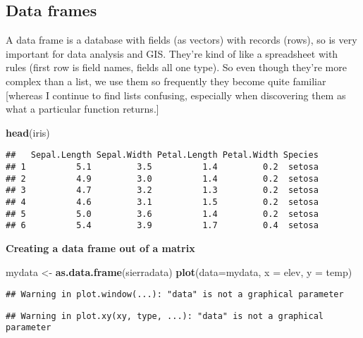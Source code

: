 \documentclass[
]{book}
\newenvironment{Shaded}{\begin{snugshade}}{\end{snugshade}}
\newcommand{\DataTypeTok}[1]{\textcolor[rgb]{0.13,0.29,0.53}{#1}}
\newcommand{\KeywordTok}[1]{\textcolor[rgb]{0.13,0.29,0.53}{\textbf{#1}}}
\newcommand{\NormalTok}[1]{#1}
\newcommand{\StringTok}[1]{\textcolor[rgb]{0.31,0.60,0.02}{#1}}
\begin{document}
\hypertarget{data-frames}{%
\subsection{Data frames}\label{data-frames}}

A data frame is a database with fields (as vectors) with records (rows), so is very important for data analysis and GIS. They're kind of like a spreadsheet with rules (first row is field names, fields all one type). So even though they're more complex than a list, we use them so frequently they become quite familiar {[}whereas I continue to find lists confusing, especially when discovering them as what a particular function returns.{]}

\begin{Shaded}
\begin{Highlighting}[]
\KeywordTok{head}\NormalTok{(iris)}
\end{Highlighting}
\end{Shaded}

\begin{verbatim}
##   Sepal.Length Sepal.Width Petal.Length Petal.Width Species
## 1          5.1         3.5          1.4         0.2  setosa
## 2          4.9         3.0          1.4         0.2  setosa
## 3          4.7         3.2          1.3         0.2  setosa
## 4          4.6         3.1          1.5         0.2  setosa
## 5          5.0         3.6          1.4         0.2  setosa
## 6          5.4         3.9          1.7         0.4  setosa
\end{verbatim}

\textbf{Creating a data frame out of a matrix}

\begin{Shaded}
\begin{Highlighting}[]
\NormalTok{mydata <-}\StringTok{ }\KeywordTok{as.data.frame}\NormalTok{(sierradata)}
\KeywordTok{plot}\NormalTok{(}\DataTypeTok{data=}\NormalTok{mydata, }\DataTypeTok{x =}\NormalTok{ elev, }\DataTypeTok{y =}\NormalTok{ temp)}
\end{Highlighting}
\end{Shaded}

\begin{verbatim}
## Warning in plot.window(...): "data" is not a graphical parameter
\end{verbatim}

\begin{verbatim}
## Warning in plot.xy(xy, type, ...): "data" is not a graphical parameter
\end{verbatim}
\end{document}
